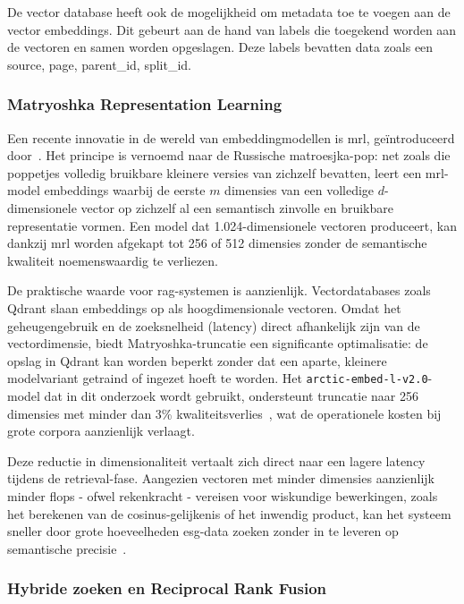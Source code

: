 De vector database heeft ook de mogelijkheid om metadata toe te voegen aan de vector embeddings. Dit gebeurt aan de hand van labels die toegekend worden aan de vectoren en samen worden opgeslagen. Deze labels bevatten data zoals een source, page, parent\_id, split\_id.

\subsubsection{Matryoshka Representation Learning}
\label{subsubsec:matryoshka}

Een recente innovatie in de wereld van embeddingmodellen is \gls{mrl}, geïntroduceerd door~\textcite{KusupatiEtAl2022}. Het principe is vernoemd naar de Russische matroesjka-pop: net zoals die poppetjes volledig bruikbare kleinere versies van zichzelf bevatten, leert een \gls{mrl}-model embeddings waarbij de eerste $m$ dimensies van een volledige $d$-dimensionele vector op zichzelf al een semantisch zinvolle en bruikbare representatie vormen. Een model dat 1.024-dimensionele vectoren produceert, kan dankzij \gls{mrl} worden afgekapt tot 256 of 512 dimensies zonder de semantische kwaliteit noemenswaardig te verliezen.

De praktische waarde voor \gls{rag}-systemen is aanzienlijk. Vectordatabases zoals Qdrant slaan embeddings op als hoogdimensionale vectoren. Omdat het geheugengebruik en de zoeksnelheid (latency) direct afhankelijk zijn van de vectordimensie, biedt Matryoshka-truncatie een significante optimalisatie: de opslag in Qdrant kan worden beperkt zonder dat een aparte, kleinere modelvariant getraind of ingezet hoeft te worden. Het \texttt{arctic-embed-l-v2.0}-model dat in dit onderzoek wordt gebruikt, ondersteunt truncatie naar 256 dimensies met minder dan 3\% kwaliteitsverlies~\autocite{YuEtAl2024}, wat de operationele kosten bij grote corpora aanzienlijk verlaagt.

Deze reductie in dimensionaliteit vertaalt zich direct naar een lagere latency tijdens de retrieval-fase. Aangezien vectoren met minder dimensies aanzienlijk minder \glspl{flop} - ofwel rekenkracht - vereisen voor wiskundige bewerkingen, zoals het berekenen van de cosinus-gelijkenis of het inwendig product, kan het systeem sneller door grote hoeveelheden \gls{esg}-data zoeken zonder in te leveren op semantische precisie~\textcite{KusupatiEtAl2022}.

\subsubsection{Hybride zoeken en Reciprocal Rank Fusion}
\label{subsubsec:hybride-zoeken}

